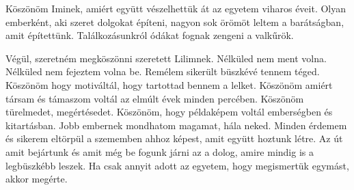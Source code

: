 Köszönöm Iminek, amiért együtt vészelhettük át az egyetem viharos éveit. Olyan emberként, aki szeret dolgokat építeni, nagyon sok örömöt leltem a barátságban, amit építettünk. Találkozásunkról ódákat fognak zengeni a valkűrök.

Végül, szeretném megköszönni szeretett Lilimnek. Nélküled nem ment volna. Nélküled nem fejeztem volna be. Remélem sikerült büszkévé tennem téged. Köszönöm hogy motiváltál, hogy tartottad bennem a lelket. Köszönöm amiért társam és támaszom voltál az elmúlt évek minden percében. Köszönöm türelmedet, megértésedet. Köszönöm, hogy példaképem voltál emberségben és kitartásban. Jobb embernek mondhatom magamat, hála neked. Minden érdemem és sikerem eltörpül a szememben ahhoz képest, amit együtt hoztunk létre. Az út amit bejártunk és amit még be fogunk járni az a dolog, amire mindig is a legbüszkébb leszek. Ha csak annyit adott az egyetem, hogy megismertük egymást, akkor megérte.